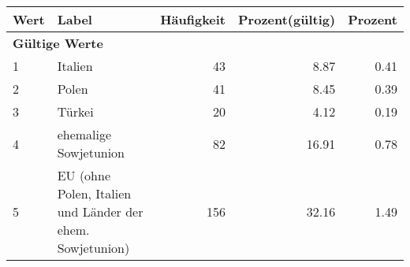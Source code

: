      \begin{longtable}{lXrrr}
     \toprule
     \textbf{Wert} & \textbf{Label} & \textbf{Häufigkeit} & \textbf{Prozent(gültig)} & \textbf{Prozent} \\
     \endhead
     \midrule
     \multicolumn{5}{l}{\textbf{Gültige Werte}}\\

     1 &
     \multicolumn{1}{X}{ Italien   } &


       \num{43} &
       \num[round-mode=places,round-precision=2]{8.87} &
         \num[round-mode=places,round-precision=2]{0.41} \\

     2 &
     \multicolumn{1}{X}{ Polen   } &


       \num{41} &
       \num[round-mode=places,round-precision=2]{8.45} &
         \num[round-mode=places,round-precision=2]{0.39} \\

     3 &
     \multicolumn{1}{X}{ Türkei   } &


       \num{20} &
       \num[round-mode=places,round-precision=2]{4.12} &
         \num[round-mode=places,round-precision=2]{0.19} \\

     4 &
     \multicolumn{1}{X}{ ehemalige Sowjetunion   } &


       \num{82} &
       \num[round-mode=places,round-precision=2]{16.91} &
         \num[round-mode=places,round-precision=2]{0.78} \\

     5 &
     \multicolumn{1}{X}{ EU (ohne Polen, Italien und Länder der ehem. Sowjetunion)   } &


       \num{156} &
       \num[round-mode=places,round-precision=2]{32.16} &
         \num[round-mode=places,round-precision=2]{1.49} \\


\end{longtable}
